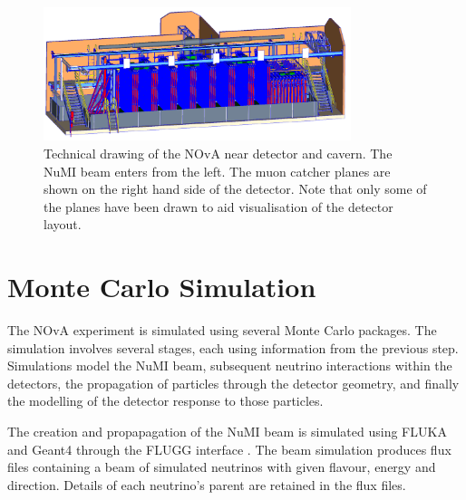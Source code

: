 \begin{figure}
  \centering
  \includegraphics[width=0.8\textwidth]{../../img/baird/det/ND_01.png}
  \caption{Technical drawing of the NOvA near detector and 
    cavern. The NuMI beam enters from the left. The muon
    catcher planes are shown on the right hand side of the
    detector. Note that only some of the planes have been drawn to
    aid visualisation of the detector layout.} 
  \label{fig:neardet}
\end{figure}



\section{Monte Carlo Simulation}

The NOvA experiment is simulated using several Monte Carlo packages.
The simulation involves several stages, each using information
from the previous step. Simulations model the
NuMI beam, subsequent neutrino interactions within the detectors,
the propagation of particles through the detector geometry, and
finally the modelling of the detector response to those particles.

The creation and propapagation of the NuMI beam is simulated using FLUKA
and Geant4 through the FLUGG interface \cite{FLUKA, ferrari2005fluka,
  agostinelli2003geant4}. The beam simulation produces flux files
containing a beam of simulated neutrinos with given flavour, energy
and direction. Details of each neutrino's parent are retained in the
flux files.

